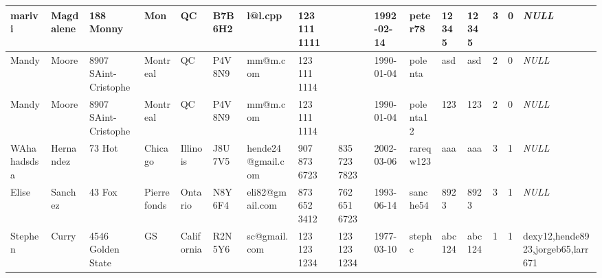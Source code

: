 \begin{longtable}{|l|l|l|l|l|l|l|l|l|l|l|l|l|l|l|l|}
marivi & Magdalene & 188 Monny & Mon & QC & B7B 6H2 & l@l.cpp & 123 111 1111 &  & 1992-02-14 & peter78 & 12345 & 12345 & 3 & 0 & \textit{NULL} \\ \hline 
Mandy & Moore & 8907 SAint-Cristophe & Montreal & QC & P4V 8N9 & mm@m.com & 123 111 1114 &  & 1990-01-04 & polenta & asd & asd & 2 & 0 & \textit{NULL} \\ \hline 
Mandy & Moore & 8907 SAint-Cristophe & Montreal & QC & P4V 8N9 & mm@m.com & 123 111 1114 &  & 1990-01-04 & polenta12 & 123 & 123 & 2 & 0 & \textit{NULL} \\ \hline 
WAhahadsdsa & Hernandez & 73 Hot & Chicago & Illinois & J8U 7V5 & hende24@gmail.com & 907 873 6723 & 835 723 7823 & 2002-03-06 & rareqw123 & aaa & aaa & 3 & 1 & \textit{NULL} \\ \hline 
Elise & Sanchez & 43 Fox & Pierrefonds & Ontario & N8Y 6F4 & eli82@gmail.com & 873 652 3412 & 762 651 6723 & 1993-06-14 & sanche54 & 8923 & 8923 & 3 & 1 & \textit{NULL} \\ \hline 
Stephen & Curry & 4546 Golden State & GS & California & R2N 5Y6 & sc@gmail.com & 123 123 1234 & 123 123 1234 & 1977-03-10 & stephc & abc124 & abc124 & 1 & 1 & dexy12,hende8923,jorgeb65,larr671 \\ \hline 
 \end{longtable}
